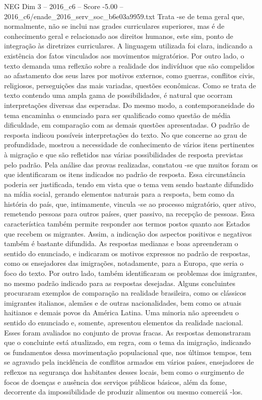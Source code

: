 \begin{textsample}{NEG Dim 3 – 2016\_c6 – Score -5.00 – 2016\_c6/enade\_2016\_serv\_soc\_b6e03a9959.txt}
Trata -se de tema geral que, normalmente, não se inclui nas grades curriculares superiores, mas é de conhecimento geral e relacionado aos direitos humanos, este sim, ponto de integração às diretrizes curriculares.
A linguagem utilizada foi clara, indicando a existência dos fatos vinculados aos movimentos migratórios.
Por outro lado, o texto demanda uma reflexão sobre a realidade dos indivíduos que são compelidos ao afastamento dos seus lares por motivos externos, como guerras, conflitos civis, religiosos, perseguições das mais variadas, questões econômicas.
Como se trata de texto contendo uma ampla gama de possibilidades, é natural que ocorram interpretações diversas das esperadas.
Do mesmo modo, a contemporaneidade do tema encaminha o enunciado para ser qualificado como questão de média dificuldade, em comparação com as demais questões apresentadas.
O padrão de resposta indicou possíveis interpretações do texto.
No que concerne ao grau de profundidade, mostrou a necessidade de conhecimento de vários itens pertinentes à migração e que são refletidos nas várias possibilidades de resposta previstas pelo padrão.
Pela análise das provas realizadas, constatou -se que muitos foram os que identificaram os itens indicados no padrão de resposta.
Essa circunstância poderia ser justificada, tendo em vista que o tema vem sendo bastante difundido na mídia social, gerando elementos naturais para a resposta, bem como da história do país, que, intimamente, vincula -se ao processo migratório, quer ativo, remetendo pessoas para outros países, quer passivo, na recepção de pessoas.
Essa característica também permite responder aos termos postos quanto aos Estados que recebem os migrantes.
Assim, a indicação dos aspectos positivos e negativos também é bastante difundida.
As respostas medianas e boas apreenderam o sentido do enunciado, e indicaram os motivos expressos no padrão de respostas, como os ensejadores das imigrações, notadamente, para a Europa, que seria o foco do texto.
Por outro lado, também identificaram os problemas dos imigrantes, no mesmo padrão indicado para as respostas desejadas.
Alguns concluintes procuraram exemplos de comparação na realidade brasileira, como os clássicos imigrantes italianos, alemães e de outras nacionalidades, bem como os atuais haitianos e demais povos da América Latina.
Uma minoria não apreendeu o sentido do enunciado e, somente, apresentou elementos da realidade nacional.
Esses foram avaliados no conjunto de provas fracas.
As respostas demonstraram que o concluinte está atualizado, em regra, com o tema da imigração, indicando os fundamentos dessa movimentação populacional que, nos últimos tempos, tem se agravado pela incidência de conflitos armados em vários países, ensejadores de reflexos na segurança dos habitantes desses locais, bem como o surgimento de focos de doenças e ausência dos serviços públicos básicos, além da fome, decorrente da impossibilidade de produzir alimentos ou mesmo comerciá -los.

\end{textsample}
